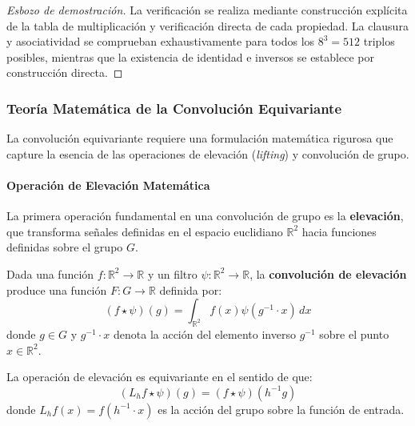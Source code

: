 \begin{proof}[Esbozo de demostración]
La verificación se realiza mediante construcción explícita de la tabla de multiplicación y verificación directa de cada propiedad. La clausura y asociatividad se comprueban exhaustivamente para todos los $8^3 = 512$ triplos posibles, mientras que la existencia de identidad e inversos se establece por construcción directa.
\end{proof}

\subsubsection{Teoría Matemática de la Convolución Equivariante}\label{subsubsec:convolucion_equivariante_matematica}

La convolución equivariante requiere una formulación matemática rigurosa que capture la esencia de las operaciones de elevación (\textit{lifting}) y convolución de grupo. 

\paragraph{Operación de Elevación Matemática}

La primera operación fundamental en una convolución de grupo es la \textbf{elevación}, que transforma señales definidas en el espacio euclidiano $\mathbb{R}^2$ hacia funciones definidas sobre el grupo $G$.

\begin{definition}\label{def:convolucion_elevacion}
Dada una función $f: \mathbb{R}^2 \to \mathbb{R}$ y un filtro $\psi: \mathbb{R}^2 \to \mathbb{R}$, la \textbf{convolución de elevación} produce una función $F: G \to \mathbb{R}$ definida por:
\begin{equation}
(f \star \psi)(g) = \int_{\mathbb{R}^2} f(x) \psi(g^{-1} \cdot x) \, dx
\end{equation}
donde $g \in G$ y $g^{-1} \cdot x$ denota la acción del elemento inverso $g^{-1}$ sobre el punto $x \in \mathbb{R}^2$.
\end{definition}

\begin{theorem}\label{thm:equivarianza_elevacion}
La operación de elevación es equivariante en el sentido de que:
\begin{equation}
(L_h f \star \psi)(g) = (f \star \psi)(h^{-1}g)
\end{equation}
donde $L_h f(x) = f(h^{-1} \cdot x)$ es la acción del grupo sobre la función de entrada.
\end{theorem}

